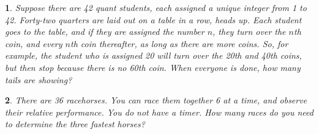 \documentclass{report}
\newtheorem{problem}{}
\numberwithin{problem}{chapter} %
\begin{document}
\begin{problem}
Suppose there are 42 quant students, each assigned a unique integer from 1 to 42. Forty-two quarters are laid out on a table in a row, heads up. Each student goes to the table, and if they are assigned the number $n$, they turn over the $n$th coin, and every $n$th coin thereafter, as long as there are more coins. So, for example, the student who is assigned 20 will turn over the 20th and 40th coins, but then stop because there is no 60th coin. When everyone is done, how many tails are showing?
\end{problem}

\begin{problem}
There are 36 racehorses. You can race them together 6 at a time, and observe their relative performance. You do not have a timer. How many races do you need to determine the three fastest horses?
\end{problem}

\printbibliography
\end{document}
